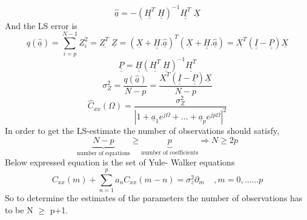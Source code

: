 $$\underline{\hat{a}} = -(\underline{\underline{H^T}} \; \underline{\underline{H}} )^{-1}\underline{\underline{H^T}}
\; \underline{X}$$
\noindent And the LS error is 
$$q(\underline{\hat{a}}) = \sum_{i=p}^{N-1}Z_i^2 = \underline{Z^T}\;\underline{Z}=(\underline{X} + \underline{\underline{H}}.\underline{\hat{a}})^T(\underline{X} + \underline{\underline{H}}.\underline{\hat{a}}) = \underline{X^T}(\underline{\underline{I}}-\underline{\underline{P}})\underline{X}$$
$$\underline{\underline{P}}=\underline{\underline{H}}(\underline{\underline{H^T}}\;\underline{\underline{H}})^{-1}\underline{\underline{H^T}}$$
$$\sigma_Z^2 = \frac{q(\underline{\hat{a}})}{N-p}=\frac{\underline{X^T}(\underline{\underline{I}}-\underline{\underline{P}})\underline{X}}{N-p}$$
$$\hat{C}_{xx}(\Omega) = \frac{\sigma_Z^2}{|1+\underline{a}_1e^{j\Omega}+...+\underline{a}_pe^{jp\Omega}|^2}$$
\noindent In order to get the LS-estimate the number of observations should satisfy,
$$\underbrace{N-p}_\text{number of equations} \geq \underbrace{p}_\text{number of coefficients} \Rightarrow N \geq 2p$$ 
Below expressed equation is the set of Yule- Walker equations \\
$$C_{xx}(m) + \sum_{n=1}^pa_nC_{xx}(m-n) = \sigma_z^2 \partial_m  \;\;\;\;,m =0,......p$$
\noindent So to determine the estimates of the parameters the number of observations has to be  N $\geq$ p+1.



